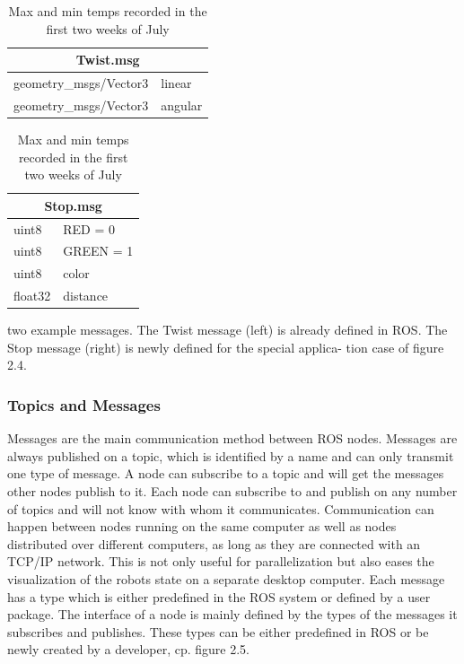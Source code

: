 \begin{table}[htbp]
	\begin{subtable}[h]{0.40\textwidth}
		\centering
		\begin{tabular}{| p{4cm}| p{1.5cm} |}
			\hline 
			\multicolumn{2}{|c|}{Twist.msg} \\
			\hline
			geometry\_msgs/Vector3 & linear  \\
			geometry\_msgs/Vector3 & angular \\
			\hline  
		\end{tabular}
		\caption{First Week}
		\label{tab:week1}
	\end{subtable}
	\hfill
	\begin{subtable}[h]{0.40\textwidth}
		\centering
		\begin{tabular}{| p{1.5cm}| p{2.5cm} |}
			\hline 
			\multicolumn{2}{|c|}{Stop.msg} \\
			\hline
			uint8   & RED = 0   \\
			uint8   & GREEN = 1 \\
			uint8   & color     \\
			float32 & distance  \\
			\hline  
		\end{tabular}
		\caption{First Week}
		\label{tab:week1}
	\end{subtable}
	\caption{Max and min temps recorded in the first two weeks of July}
	\label{tab:temps}
\end{table}

two example messages.  The
Twist
message (left) is already defined in
ROS. The
Stop
message (right) is newly defined for the special applica-
tion case of figure 2.4.

\subsubsection*{Topics and Messages}
Messages are the main communication method between ROS nodes.  Messages are
always published on a topic, which is identified by a name and can only transmit
one  type  of  message.   A  node  can  subscribe  to  a  topic  and  will  get  the  messages
other nodes publish to it.  Each node can subscribe to and publish on any number
of topics and will not know with whom it communicates.
Communication can happen between nodes running on the same computer as well
as nodes distributed over different computers,  as long as they are connected with
an TCP/IP network.  This is not only useful for parallelization but also eases the
visualization of the robots state on a separate desktop computer.  Each message has
a type which is either predefined in the ROS system or defined by a user package.
The interface of a node is mainly defined by the types of the messages it subscribes
and publishes.  These types can be either predefined in ROS or be newly created by
a developer, cp.  figure 2.5.

